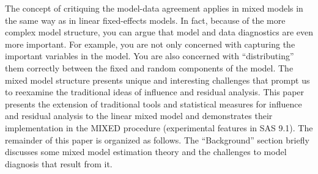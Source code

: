 \documentclass[12pt, a4paper]{article}
\begin{document}
The concept of critiquing the model-data agreement applies in mixed models in the same way as in linear
fixed-effects models. In fact, because of the more complex model structure, you can argue that model and
data diagnostics are even more important. For example, you are not only concerned with capturing the
important variables in the model. You are also concerned with “distributing” them correctly between the
fixed and random components of the model. The mixed model structure presents unique and interesting
challenges that prompt us to reexamine the traditional ideas of influence and residual analysis.
This paper presents the extension of traditional tools and statistical measures for influence and residual
analysis to the linear mixed model and demonstrates their implementation in the MIXED procedure (experimental
features in SAS 9.1). The remainder of this paper is organized as follows. The “Background” section
briefly discusses some mixed model estimation theory and the challenges to model diagnosis that result
from it.



















\end{document}
